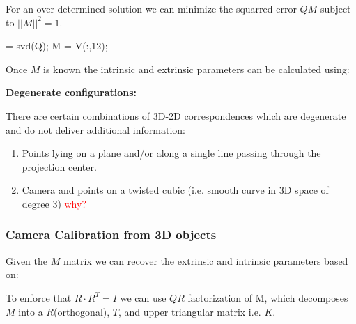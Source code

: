 \documentclass[10pt,a4paper]{scrartcl}
\begin{document}
\begin{multicols*}{2}
For an over-determined solution we can minimize the squarred error $QM$ subject to $||M||^2=1$.

\begin{TPMatlab}
[U,S,V] = svd(Q); 
M = V(:,12);
\end{TPMatlab} 

Once $M$ is known the intrinsic and extrinsic parameters can be calculated using:


\textbf{Degenerate configurations:}

There are certain combinations of 3D-2D correspondences which are degenerate and do not deliver additional information:

\begin{enumerate}
\item Points lying on a plane and/or along a single line passing through the projection center.
\item Camera and points on a twisted cubic (i.e. smooth curve in 3D space of degree 3) \textcolor{red}{why?}
\end{enumerate}

\subsubsection{Camera Calibration from 3D objects}

Given the $M$ matrix we can recover the extrinsic and intrinsic parameters based on:


To enforce that $R\cdot R^T=I$ we can use $QR$ factorization of M, which decomposes $M$ into a $R$(orthogonal), $T$, and upper triangular matrix i.e. $K$.

\vspace{3ex}


\end{multicols*}
\end{document}
